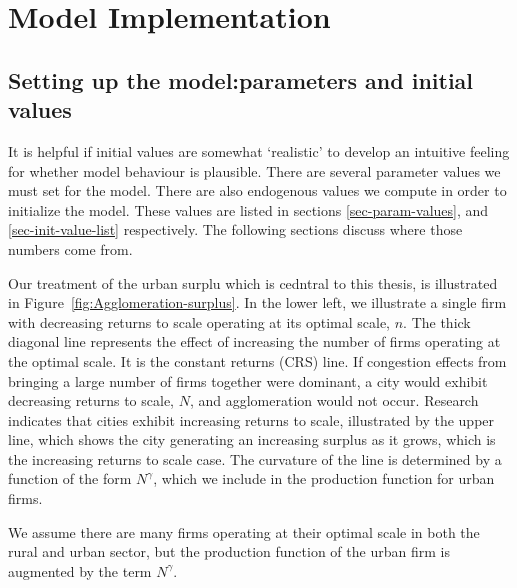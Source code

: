 \chapter[Model Implementation]{Model Implementation}

\section{Setting up the model:\newline parameters and initial values}
It is helpful if initial values are somewhat `realistic' to develop an intuitive feeling for whether model behaviour is plausible. 
There are several parameter values we must set for the model. There are also endogenous values we compute in order to initialize the model. These values are listed in sections \ref{sec-param-values}, and \ref{sec-init-value-list} respectively. The following sections discuss where those numbers come from. %

Our treatment of the urban surplu which is cedntral to this thesis, is illustrated in Figure~\ref{fig:Agglomeration-surplus}. In the lower left, we illustrate a single firm with decreasing returns to scale operating at its optimal scale, $n$. The thick diagonal line represents the effect of  increasing the number of firms operating at the optimal scale. It is the constant returns (CRS) line. If congestion effects from bringing a large number of firms together were dominant, a city would exhibit decreasing returns to  scale,  $N$, and agglomeration would not occur. Research indicates that cities exhibit increasing returns to scale, illustrated by the upper line, which shows the city generating an increasing surplus as it grows, which is the increasing returns to scale case. The curvature of the line is determined by a function of the form $N^\gamma$, which we include in the production function for urban firms. 

We assume there are many firms operating at their optimal scale in both the rural and urban sector, but the production function of the urban firm is augmented by the term $N^\gamma$. 

